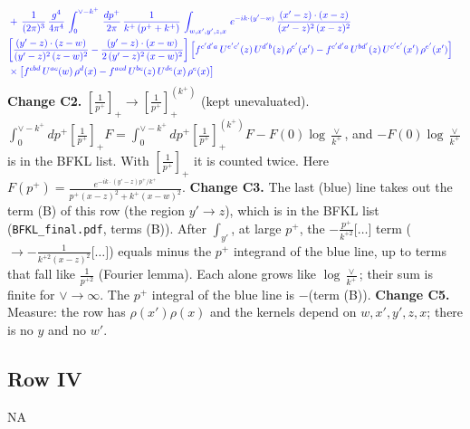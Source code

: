 \documentclass[9pt]{article}
\newcommand{\new}[1]{{\color{blue}#1}}
\newcommand{\nc}{\color{blue}}
\numberwithin{equation}{section}
\begin{document}
\begin{align}
\notag \\ & \nc +\,\frac{1}{(2\pi)^{3}}\,\frac{g^{4}}{4\pi^{4}}\,\int_{0}^{\vee-k^{+}}\, \frac{dp^{+}}{2\pi}\,\frac{1}{k^{+}\,(p^{+}+k^{+})}\,\int_{w,x',y',z,x}\, e^{-ik\cdot (y'-w)}\,\frac{(x'-z)\cdot (x-z)}{(x'-z)^{2}\,(x-z)^{2}}\notag \\ & \nc \bigg[\frac{(y'-z)\cdot (z-w)}{(y'-z)^{2}\,(z-w)^{2}}-\frac{(y'-z)\cdot (x-w)}{2\,(y'-z)^{2}\,(x-w)^{2}}\bigg]\left[f^{c'd'a}\,U^{e'c'}(z)\,U^{d'b}(z)\,\rho^{e'}(x')-f^{c'd'a}\, U^{bd'}(z)\,U^{c'e'}(x')\,\rho^{e'}(x')\right]\notag \\ & \nc \times\left[f^{cbd}\,U^{ac}(w)\,\rho^{d}(x) -f^{acd}\,U^{bc}(z)\,U^{de}(x)\,\rho^{e}(x)\right]
\end{align}
\new{\textbf{Change C2.} $\left[\frac{1}{p^+}\right]_+\to\left[\frac{1}{p^+}\right]_+^{(k^+)}$ (kept unevaluated). $\int_0^{\vee-k^+}dp^+\left[\frac{1}{p^+}\right]_+F=\int_0^{\vee-k^+}dp^+\left[\frac{1}{p^+}\right]_+^{(k^+)}F-F(0)\log\frac{\vee}{k^+}$, and $-F(0)\log\frac{\vee}{k^+}$ is in the BFKL list. With $\left[\frac{1}{p^+}\right]_+$ it is counted twice. Here $F(p^+)=\frac{e^{-ik\cdot(y'-z)p^+/k^+}}{p^+(x-z)^2+k^+(x-w)^2}$. \textbf{Change C3.} The last (blue) line takes out the term (B) of this row (the region $y'\to z$), which is in the BFKL list (\texttt{BFKL\_final.pdf}, terms (B)). After $\int_{y'}$, at large $p^+$, the $-\frac{p^+}{k^{+2}}\big[\dots\big]$ term ($\to-\frac{1}{k^{+2}(x-z)^2}\big[\dots\big]$) equals minus the $p^+$ integrand of the blue line, up to terms that fall like $\frac{1}{p^{+2}}$ (Fourier lemma). Each alone grows like $\log\frac{\vee}{k^+}$; their sum is finite for $\vee\to\infty$. The $p^+$ integral of the blue line is $-$(term (B)). \textbf{Change C5.} Measure: the row has $\rho(x')\rho(x)$ and the kernels depend on $w,x',y',z,x$; there is no $y$ and no $w'$.}
\subsection{Row IV}
\textsc{NA}
\end{document}
